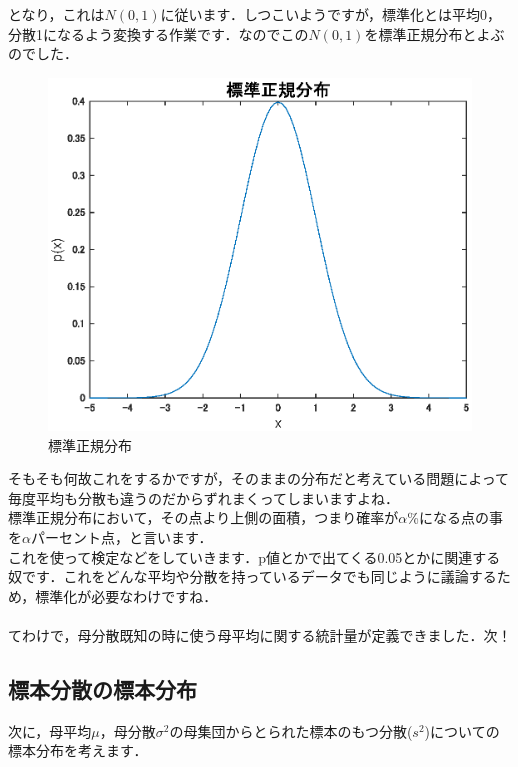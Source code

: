 \documentclass[11pt,a4paper,uplatex]{ujreport} 	%
\begin{document}
となり，これは$N(0,1)$に従います．しつこいようですが，標準化とは平均0，分散1になるよう変換する作業です．なのでこの$N(0,1)$を標準正規分布とよぶのでした．\\

\begin{figure}[H]
  \centering
  \includegraphics[width=15cm]{../figures/std-normal.eps}
  \caption{標準正規分布}
\end{figure}

そもそも何故これをするかですが，そのままの分布だと考えている問題によって毎度平均も分散も違うのだからずれまくってしまいますよね．\\

標準正規分布において，その点より上側の面積，つまり確率が$\alpha$\%になる点の事を$\alpha$パーセント点，と言います．\\

これを使って検定などをしていきます．p値とかで出てくる0.05とかに関連する奴です．これをどんな平均や分散を持っているデータでも同じように議論するため，標準化が必要なわけですね．\\
\\

てわけで，母分散既知の時に使う母平均に関する統計量が定義できました．次！
\subsection{標本分散の標本分布}
次に，母平均$\mu$，母分散$\sigma^2$の母集団からとられた標本のもつ分散($s^2$)についての標本分布を考えます．\\
\end{document}

